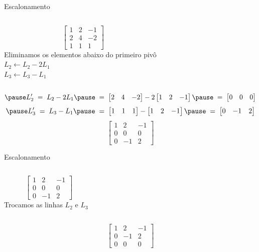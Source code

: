 \begin{resolution}{Escalonamento}
  \begin{columns}
    \[\;\;\;
      \begin{bmatrix}
        1 & 2 & -1 \\
        2 & 4 & -2 \\
        1 & 1 &  1
      \end{bmatrix}
    \]
    \pause
    Eliminamos os elementos abaixo do primeiro pivô
    \\ \pause
    \(
      L_2 \leftarrow L_2 - 2 L_1
    \)
    \\ \pause
    \(
      L_3 \leftarrow L_3 - L_1
    \)
  \end{columns}
  \vspace{-\baselineskip}
  \[
    \pause
    L'_2
    \;=\;
    L_2 - 2 L_1
    \pause
    \;=\;
    \begin{bmatrix}
      2 & 4 & -2
    \end{bmatrix}
    - 2
    \begin{bmatrix}
      1 & 2 & -1
    \end{bmatrix}
    \pause
    \;=\;
    \begin{bmatrix}
      0 & 0  & 0
    \end{bmatrix}
  \]
  \[
    \pause
    L'_3
    \;=\;
    L_3 - L_1
    \pause
    \;=\;
    \begin{bmatrix}
      1 & 1 &  1
    \end{bmatrix}
    -
    \begin{bmatrix}
      1 & 2 & -1
    \end{bmatrix}
    \pause
    \;=\;
    \begin{bmatrix}
      0 & -1 & 2
    \end{bmatrix}
  \]
  \pause
  \[
    \begin{bmatrix}
      1 & 2  & -1 \\
      0 & 0  & 0  \\
      0 & -1 & 2
    \end{bmatrix}
  \]
\end{resolution}

\begin{resolution}{Escalonamento}
  \begin{columns}
    \[\;\;\;
      \begin{bmatrix}
        1 & 2  & -1 \\
        0 & 0  & 0  \\
        0 & -1 & 2
      \end{bmatrix}
    \]
    \pause
    Trocamos as linhas $L_2$ e $L_3$
  \end{columns}

  \pause
  \[
    \begin{bmatrix}
      1 & 2  & -1 \\
      0 & -1 & 2  \\
      0 & 0  & 0
    \end{bmatrix}
  \]
\end{resolution}

